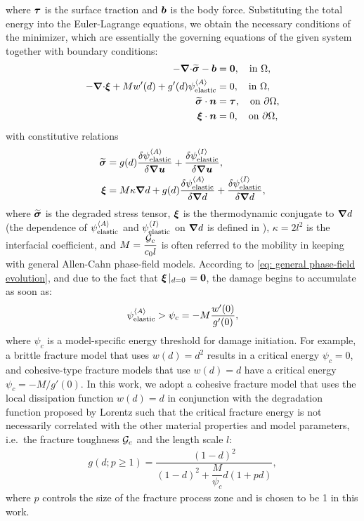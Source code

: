 where $\boldsymbol{\tau}$ is the surface traction and $\boldsymbol{b}$ is the body force. Substituting the total energy into the Euler-Lagrange equations, we obtain the necessary conditions of the minimizer, which are essentially the governing equations of the given system together with boundary conditions:
\begin{align}
  - {\boldsymbol{\nabla} \cdot} \widetilde{\boldsymbol{\sigma}} - \boldsymbol{b}                                      & = \boldsymbol{0} , \quad \text{in }\Omega,             \\
  - {\boldsymbol{\nabla} \cdot} \boldsymbol{\xi} +  M w'(d) + g'(d)\psi_{\text{elastic}}^{\left< A \right>} & = 0, \quad \text{in } \Omega ,                 \\
  \widetilde{\boldsymbol{\sigma}} \cdot \boldsymbol{n}                                               & = \boldsymbol{\tau}, \quad \text{on } {\partial \Omega} , \\
  \boldsymbol{\xi} \cdot \boldsymbol{n}                                               & = 0, \quad \text{on } {\partial \Omega},
\end{align}
with constitutive relations
\begin{align}
  \widetilde{\boldsymbol{\sigma}} & = g(d)\dfrac{\delta \psi_{\text{elastic}}^{\left< A \right>}}{\delta \boldsymbol{\nabla}\boldsymbol{u}} + \dfrac{\delta \psi_{\text{elastic}}^{\left< I \right>}}{\delta \boldsymbol{\nabla}\boldsymbol{u}},              \\
  \boldsymbol{\xi} & = M \kappa \boldsymbol{\nabla} d + g(d) \dfrac{\delta \psi_{\text{elastic}}^{\left< A \right>} }{\delta \boldsymbol{\nabla} d} + \dfrac{\delta \psi_{\text{elastic}}^{\left< I \right>}}{\delta \boldsymbol{\nabla} d},
\end{align}
where $\widetilde{\boldsymbol{\sigma}}$ is the degraded stress tensor, $\boldsymbol{\xi}$ is the thermodynamic conjugate to $\boldsymbol{\nabla} d$ (the dependence of $\psi_{\text{elastic}}^{\left< A \right>}$ and $\psi_{\text{elastic}}^{\left< I \right>}$ on $\boldsymbol{\nabla} d$ is defined in  ), $\kappa = 2l^2$ is the interfacial coefficient, and $M = \dfrac{{\mathcal{G}_c}}{c_0l}$ is often referred to the mobility in keeping with general Allen-Cahn phase-field models. According to \eqref{eq: general phase-field evolution}, and due to the fact that $\boldsymbol{\xi}\left\vert_{d=0}\right. = \boldsymbol{0}$, the damage begins to accumulate as soon as:
\begin{align}
  \psi_{\text{elastic}}^{\left< A \right>} > \psi_c = -M\dfrac{w'(0)}{g'(0)} ,
\end{align}
where $\psi_c$ is a model-specific energy threshold for damage initiation. For example, a brittle fracture model that uses $w(d) = d^2$ results in a critical energy $\psi_c = 0$, and cohesive-type fracture models that use $w(d) = d$ have a critical energy $\psi_c = -M/g'(0)$.  In this work, we adopt a cohesive fracture model that uses the local dissipation function $w(d) = d$ in conjunction with the degradation function proposed by Lorentz \cite{lorentz2011convergence, lorentz2017nonlocal} such that the critical fracture energy is not necessarily correlated with the other material properties and model parameters, i.e.\ the fracture toughness ${\mathcal{G}_c}$ and the length scale $l$:
\begin{align}
  g(d; p \geqslant 1) = \dfrac{(1-d)^2}{(1-d)^2+\dfrac{M}{\psi_c}d(1+pd)} ,
\end{align}
where $p$ controls the size of the fracture process zone and is chosen to be 1 in this work.


